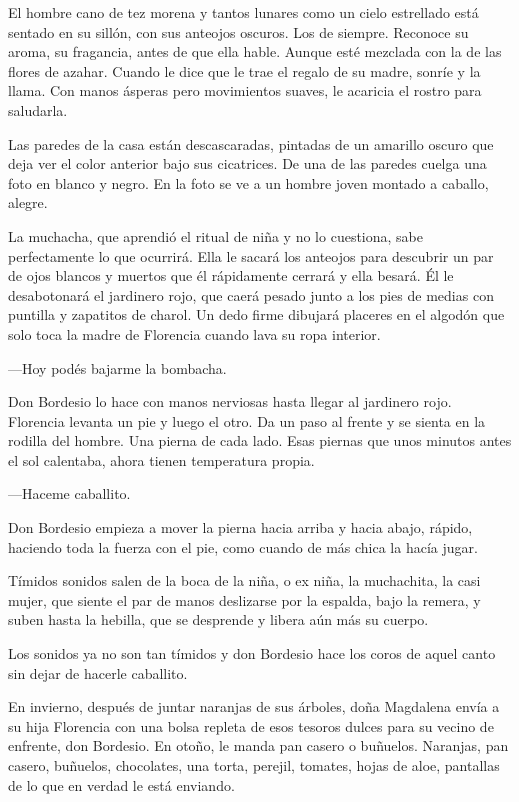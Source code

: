 \documentclass[11pt,twoside,openright]{book}
\begin{document}
El hombre cano de tez morena y tantos lunares como un cielo estrellado está sentado en su sillón, con sus anteojos oscuros. Los de siempre. Reconoce su aroma, su fragancia, antes de que ella hable. Aunque esté mezclada con la de las flores de azahar. Cuando le dice que le trae el regalo de su madre, sonríe y la llama. Con manos ásperas pero movimientos suaves, le acaricia el rostro para saludarla.

Las paredes de la casa están descascaradas, pintadas de un amarillo oscuro que deja ver el color anterior bajo sus cicatrices. De una de las paredes cuelga una foto en blanco y negro. En la foto se ve a un hombre joven montado a caballo, alegre.

La muchacha, que aprendió el ritual de niña y no lo cuestiona, sabe perfectamente lo que ocurrirá. Ella le sacará los anteojos para descubrir un par de ojos blancos y muertos que él rápidamente cerrará y ella besará. Él le desabotonará el jardinero rojo, que caerá pesado junto a los pies de medias con puntilla y zapatitos de charol. Un dedo firme dibujará placeres en el algodón que solo toca la madre de Florencia cuando lava su ropa interior.

—Hoy podés bajarme la bombacha.

Don Bordesio lo hace con manos nerviosas hasta llegar al jardinero rojo. Florencia levanta un pie y luego el otro. Da un paso al frente y se sienta en la rodilla del hombre. Una pierna de cada lado. Esas piernas que unos minutos antes el sol calentaba, ahora tienen temperatura propia.

—Haceme caballito.

Don Bordesio empieza a mover la pierna hacia arriba y hacia abajo, rápido, haciendo toda la fuerza con el pie, como cuando de más chica la hacía jugar.

Tímidos sonidos salen de la boca de la niña, o ex niña, la muchachita, la casi mujer, que siente el par de manos deslizarse por la espalda, bajo la remera, y suben  hasta la hebilla, que se desprende y libera aún más su cuerpo.

Los sonidos ya no son tan tímidos y don Bordesio hace los coros de aquel canto sin dejar de hacerle caballito.

En invierno, después de juntar naranjas de sus árboles, doña Magdalena envía a su hija Florencia con una bolsa repleta de esos tesoros dulces para su vecino de enfrente, don Bordesio. En otoño, le manda pan casero o buñuelos. Naranjas, pan casero, buñuelos, chocolates, una torta, perejil, tomates, hojas de aloe, pantallas de lo que en verdad le está enviando.



\cleardoublepage

%
\end{document}
